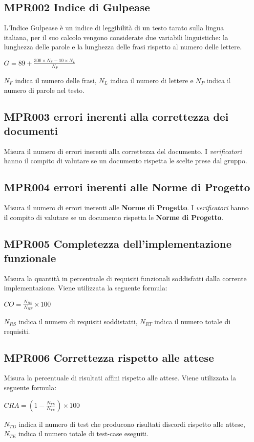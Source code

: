\subsection{MPR002 Indice di Gulpease}
L’Indice Gulpease è un indice di leggibilità di un testo tarato sulla lingua italiana, per il suo calcolo vengono considerate due variabili linguistiche: la lunghezza delle parole e la lunghezza delle frasi rispetto al numero delle lettere.
\begin{center}{$G=89+\frac{300\times N_F-10\times N_L}{N_P}$}\end{center}
$N_F$ indica il numero delle frasi, $N_L$ indica il numero di lettere e $N_P$ indica il numero di parole nel testo.

\subsection{MPR003 errori inerenti alla correttezza dei documenti}
Misura il numero di errori inerenti alla correttezza del documento. I \textit{verificatori} hanno il compito di valutare se un documento rispetta le scelte prese dal gruppo.

\subsection{MPR004 errori inerenti alle Norme di Progetto}
Misura il numero di errori inerenti alle \textbf{Norme di Progetto}. I \textit{verificatori} hanno il compito di valutare se un documento rispetta le \textbf{Norme di Progetto}.


\subsection{MPR005 Completezza dell'implementazione funzionale}
Misura la quantità in percentuale di requisiti funzionali soddisfatti dalla corrente implementazione. Viene utilizzata la seguente formula: 
\begin{center}{$CO=\frac{N_{RS}}{N_{RT}}\times 100$}\end{center}
$N_{RS}$  indica il numero di requisiti soddistatti, $N_{RT}$  indica il numero totale di requisiti.

\subsection{MPR006 Correttezza  rispetto alle attese}
Misura la percentuale di risultati affini rispetto alle attese. Viene utilizzata la seguente formula:
\begin{center}{$CRA=(1-\frac{N_{TD}}{N_{TE}})\times 100$}\end{center}
${N_{TD}}$ indica il numero di test che producono risultati discordi rispetto alle attese, ${N_{TE}}$ indica il numero totale di test-case eseguiti.

